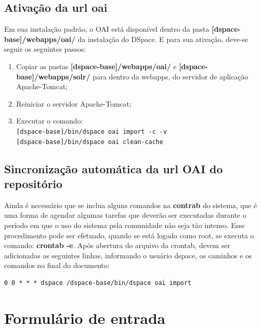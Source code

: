 \documentclass[12pt,hidelinks]{article}
\begin{document}
    \subsection{Ativação da url oai}
   
    Em sua instalação padrão, o OAI está disponível dentro da pasta \textbf{[dspace-base]/webapps/oai/} da instalação do DSpace. E para sua ativação, deve-se seguir os seguintes passos:
        
        
        \begin{enumerate}
            \item Copiar as pastas \textbf{[dspace-base]/webapps/oai/} e \textbf{[dspace-base]/webapps/solr/} para dentro da webapps, do servidor de aplicação Apache-Tomcat;
            
            \item Reiniciar o servidor Apache-Tomcat;
            
            \item Executar o comando:\\
             \texttt{[dspace-base]/bin/dspace oai import -c -v}\\
             \texttt{[dspace-base]/bin/dspace oai clean-cache}

        \end{enumerate}
        
\newpage
    \subsection{Sincronização automática da url OAI do repositório}
    Ainda é necessário que se inclua alguns comandos na \textbf{contrab} do sistema, que é uma forma de agendar algumas tarefas que deverão ser executadas durante o período em que o uso do sistema pela comunidade não seja tão intenso. Esse procedimento pode ser efetuado, quando se está logado como root, se executa o comando: \textbf{crontab -e}. Após abertura do arquivo da crontab, devem ser adicionadas as seguintes linhas, informando o usuário dspace, os caminhos e os comandos no final do documento:
    
    \begin{verbatim}
0 0 * * * dspace /dspace-base/bin/dspace oai import
    \end{verbatim}

\newpage
\section{Formulário de entrada}
\newpage
\end{document}
